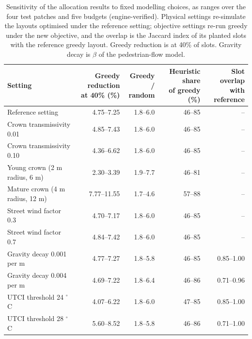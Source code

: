\begin{table}[tbp]
\centering
\footnotesize
\setlength{\tabcolsep}{4pt}
\caption{Sensitivity of the allocation results to fixed modelling choices, as ranges over the four test patches and five budgets (engine-verified). Physical settings re-simulate the layouts optimised under the reference setting; objective settings re-run greedy under the new objective, and the overlap is the Jaccard index of its planted slots with the reference greedy layout. Greedy reduction is at 40\% of slots. Gravity decay is $\beta$ of the pedestrian-flow model.}
\label{tab:T7_sensitivity}
\begin{tabular}{lrrrr}
\toprule
Setting & \makecell[r]{Greedy reduction\\at 40\% (\%)} & \makecell[r]{Greedy /\\random} & \makecell[r]{Heuristic share\\of greedy (\%)} & \makecell[r]{Slot overlap\\with reference} \\
\midrule
Reference setting & 4.75–7.25 & 1.8–6.0 & 46–85 & -- \\
Crown transmissivity 0.01 & 4.85–7.43 & 1.8–6.0 & 46–85 & -- \\
Crown transmissivity 0.10 & 4.36–6.62 & 1.8–6.0 & 46–85 & -- \\
Young crown (2 m radius, 6 m) & 2.30–3.39 & 1.9–7.7 & 46–81 & -- \\
Mature crown (4 m radius, 12 m) & 7.77–11.55 & 1.7–4.6 & 57–88 & -- \\
Street wind factor 0.3 & 4.70–7.17 & 1.8–6.0 & 46–85 & -- \\
Street wind factor 0.7 & 4.84–7.42 & 1.8–6.0 & 46–85 & -- \\
Gravity decay 0.001 per m & 4.77–7.27 & 1.8–5.8 & 46–85 & 0.85–1.00 \\
Gravity decay 0.004 per m & 4.69–7.22 & 1.8–6.4 & 46–86 & 0.71–0.96 \\
UTCI threshold 24 $^\circ$C & 4.07–6.22 & 1.8–6.0 & 47–85 & 0.85–1.00 \\
UTCI threshold 28 $^\circ$C & 5.60–8.52 & 1.8–5.8 & 46–86 & 0.71–1.00 \\
\bottomrule
\end{tabular}
\end{table}
